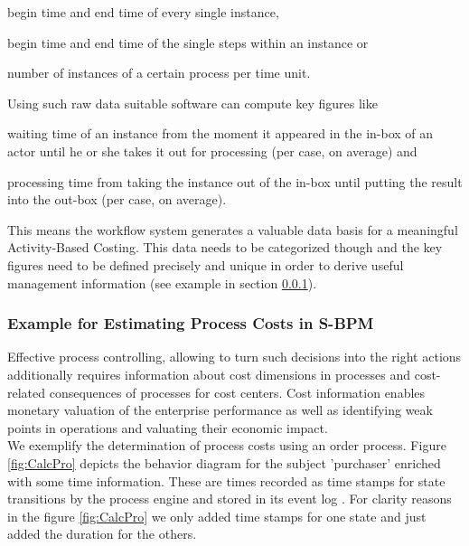 \begin{list}{-}{spacing}
\item begin time and end time of every single instance,
\item begin time and end time of the single steps within an instance or
\item number of instances of a certain process per time unit.
\end{list}
Using such raw data suitable software can compute key figures like
\begin{list}{-}{spacing}
\item waiting time of an instance from the moment it appeared in the in-box of an actor until he or she takes it out for processing (per case, on average) and
\item processing time from taking the instance out of the in-box until putting the result into the out-box (per case, on average).
\end{list}

This means the workflow system generates a valuable data basis for a meaningful Activity-Based Costing. This data needs to be categorized though and the key figures need to be defined precisely and unique in order to derive useful management information (see example in section \ref{section:ExampleABC}).

\subsubsection{Example for Estimating Process Costs in S-BPM} \label{section:ExampleABC}
Effective process controlling, allowing to turn such decisions into the right actions additionally requires information about cost dimensions in processes and cost-related consequences of processes for cost centers. Cost information enables monetary valuation of the enterprise performance as well as identifying weak points in operations and valuating their economic impact.
\\
We exemplify the determination of process costs using an order process. Figure \ref{fig:CalcPro} depicts the behavior diagram for the subject 'purchaser' enriched with some time information. These are times recorded as time stamps for state transitions by the process engine and stored in its event log \cite{article:SubProcessMon}. For clarity reasons in the figure \ref{fig:CalcPro} we only added time stamps for one state and just added the duration for the others.

